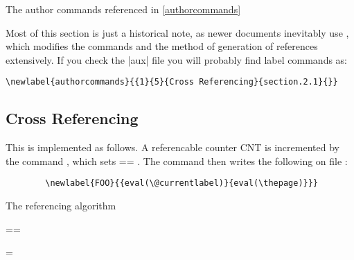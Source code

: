 The author commands referenced in \autoref{authorcommands}

Most of this section is just a historical note, as newer documents
inevitably use , which modifies the commands and the method
of generation of references extensively. If you check the |aux| file
you will probably find label commands as:

\begin{verbatim}
\newlabel{authorcommands}{{1}{5}{Cross Referencing}{section.2.1}{}}
\end{verbatim}

 \subsection{Cross Referencing}

    \begin{teX}
    \end{teX}

  This is implemented as follows.  A referencable counter  CNT  is
  incremented by the command   , which sets
   == .   The command
   then writes the following on file  :

\begin{verbatim}
        \newlabel{FOO}{{eval(\@currentlabel)}{eval(\thepage)}}}
\end{verbatim}

\LinesNumbered
\begin{algorithm}
\caption{The referencing algorithm}
   ==

   =
\end{algorithm}




